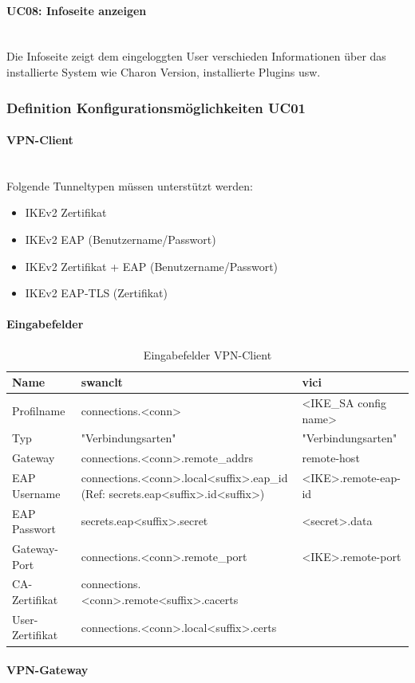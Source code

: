 \paragraph{UC08: Infoseite anzeigen}\mbox{} \\
Die Infoseite zeigt dem eingeloggten User verschieden Informationen über das installierte System wie Charon Version, installierte Plugins usw.

\subsubsection{Definition Konfigurationsmöglichkeiten UC01}
\paragraph{VPN-Client}\mbox{} \\
Folgende Tunneltypen müssen unterstützt werden:
\begin{itemize}
	\item IKEv2	Zertifikat	
	\item IKEv2 EAP (Benutzername/Passwort)
	\item IKEv2	Zertifikat + EAP (Benutzername/Passwort)
	\item IKEv2	EAP-TLS (Zertifikat)
\end{itemize}

\paragraph{Eingabefelder}
\begin{table}[H]
	\centering
    \begin{tabular}{|p{3cm}|p{7.5cm}|p{6cm}|}
    \hline    
    \rowcolor{lightblue}
	Name & swanclt & vici \\ \hline   
	Profilname & connections.<conn> & <IKE\_SA config name> \\ \hline
	Typ & "Verbindungsarten" & "Verbindungsarten" \\ \hline
	Gateway & connections.<conn>.remote\_addrs & remote-host \\ \hline
	EAP Username & 
connections.<conn>.local<suffix>.eap\_id (Ref: secrets.eap<suffix>.id<suffix>)& <IKE>.remote-eap-id \\ \hline
	EAP Passwort & secrets.eap<suffix>.secret &<secret>.data \\ \hline
	Gateway-Port & connections.<conn>.remote\_port & <IKE>.remote-port \\ \hline
	CA-Zertifikat & connections.<conn>.remote<suffix>.cacerts & \\ \hline
	User-Zertifikat & connections.<conn>.local<suffix>.certs & \\ \hline
	\end{tabular}
    \caption[Eingabefelder VPN-Client]{Eingabefelder VPN-Client}
\end{table}


\paragraph{VPN-Gateway}\mbox{} \\




